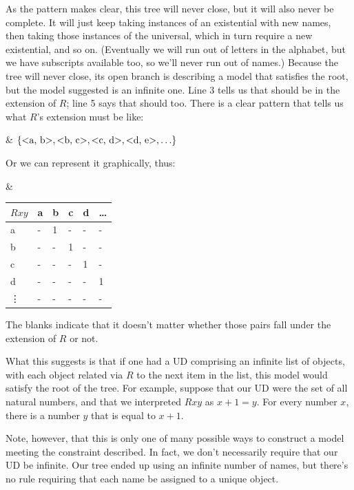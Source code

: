 As the pattern makes clear, this tree will never close, but it will also never be complete. It will just keep taking instances of an existential with new names, then taking those instances of the universal, which in turn require a new existential, and so on. (Eventually we will run out of letters in the alphabet, but we have subscripts available too, so we'll never run out of names.) Because the tree will never close, its open branch is describing a model that satisfies the root, but the model suggested is an infinite one. Line 3 tells us that  should be in the extension of $R$; line 5 says that  should too. There is a clear pattern that tells us what $R$'s extension must be like:

\begin{partialmodel}
	 & $ \{\mbox{\ensuremath{\mathopen{<}}a, b\ensuremath{\mathclose{>}}}, \mbox{\ensuremath{\mathopen{<}}b, c\ensuremath{\mathclose{>}}}, \mbox{\ensuremath{\mathopen{<}}c, d\ensuremath{\mathclose{>}}}, \mbox{\ensuremath{\mathopen{<}}d, e\ensuremath{\mathclose{>}}}, \ldots\}$
\end{partialmodel}

Or we can represent it graphically, thus: 

\begin{partialmodel}
	 & \begin{tabular}{l|lllll}
$Rxy$   & a & b & c & d & \ldots \\ \hline
a   & - & 1 & - & - & -   \\
b   & - & - & 1 & - & -   \\
c   & - & - & - & 1 & -   \\
d   & - & - & - & - & 1   \\
\vdots & - & - & - & - & -
\end{tabular}
\end{partialmodel}



The blanks indicate that it doesn't matter whether those pairs fall under the extension of $R$ or not.

What this suggests is that if one had a UD comprising an infinite list of objects, with each object related via $R$ to the next item in the list, this model would satisfy the root of the tree. For example, suppose that our UD were the set of all natural numbers, and that we interpreted $Rxy$ as $x+1=y$. For every number $x$, there is a number $y$ that is equal to $x+1$.

Note, however, that this is only one of many possible ways to construct a model meeting the constraint described. In fact, we don't necessarily require that our UD be infinite. Our tree ended up using an infinite number of names, but there's no rule requiring that each name be assigned to a unique object.

